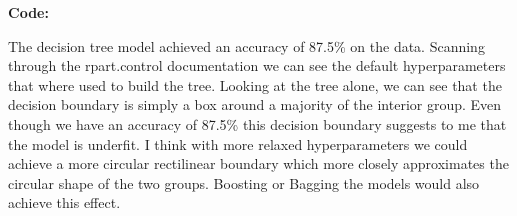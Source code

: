 \documentclass[12pt]{article}
\makeatletter
\theoremstyle{homework}
\newenvironment{exercise}[1]
{\def\@currentlabel{#1}\exercisecore}
{\endexercisecore}
\makeatother
\begin{document}
\begin{exercise}{4}
\begin{enumerate}
\begin{figure}[H]
\begin{center}
        \end{center}
      \end{figure}
      \textbf{Code:}
      \begin{center}
      
      \end{center}
      The decision tree model achieved an accuracy of 87.5\% on the data. Scanning through the rpart.control documentation we can see the default hyperparameters that where used to 
      build the tree. Looking at the tree alone, we can see that the decision boundary is simply a box around a majority of the interior group. Even though we have an accuracy of 87.5\% 
      this decision boundary suggests to me that the model is underfit. I think with more relaxed hyperparameters we could achieve a more circular rectilinear boundary which more closely 
      approximates the circular shape of the two groups. Boosting or Bagging the models would also achieve this effect. 
      \vspace{.15in}


\end{enumerate}
\end{exercise}
\end{document}
